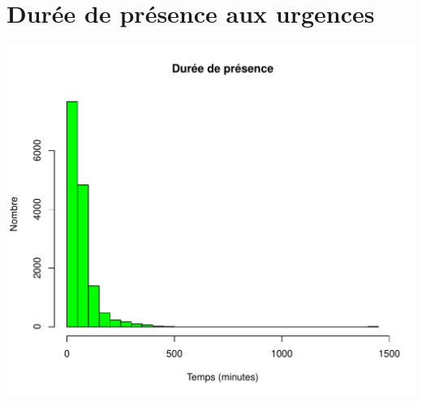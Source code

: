\documentclass[12pt,english,french,twoside]{book}\usepackage[]{graphicx}\usepackage[]{color}
\makeatletter
\def\maxwidth{ %
  \ifdim\Gin@nat@width>\linewidth
    \linewidth
  \else
    \Gin@nat@width
  \fi
}
\newenvironment{knitrout}{}{} %
\makeatother
\begin{document}
\section*{Durée de présence aux urgences}

\begin{knitrout}
\color{fgcolor}
\includegraphics[width=\maxwidth]{figure/graphe_p_gueb} 

\end{knitrout}
\end{document}
